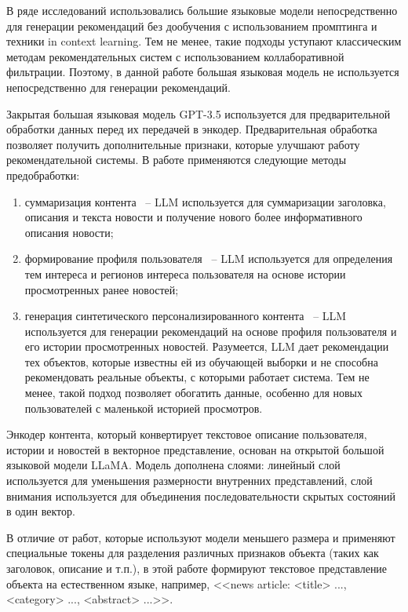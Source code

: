 В ряде исследований использовались большие языковые модели непосредственно для генерации рекомендаций без дообучения с использованием промптинга и техники in context learning. Тем не менее, такие подходы уступают классическим методам рекомендательных систем с использованием коллаборативной фильтрации. Поэтому, в данной работе большая языковая модель не используется непосредственно для генерации рекомендаций.

Закрытая большая языковая модель GPT-3.5 используется для предварительной обработки данных перед их передачей в энкодер. Предварительная обработка позволяет получить дополнительные признаки, которые улучшают работу рекомендательной системы. В работе применяются следующие методы предобработки:
\begin{enumerate}
    \item суммаризация контента ~-- LLM используется для суммаризации заголовка, описания и текста новости и получение нового более информативного описания новости;
    \item формирование профиля пользователя ~-- LLM используется для определения тем интереса и регионов интереса пользователя на основе истории просмотренных ранее новостей;
    \item генерация синтетического персонализированного контента ~-- LLM используется для генерации рекомендаций на основе профиля пользователя и его истории просмотренных новостей. Разумеется, LLM дает рекомендации тех объектов, которые известны ей из обучающей выборки и не способна рекомендовать реальные объекты, с которыми работает система. Тем не менее, такой подход позволяет обогатить данные, особенно для новых пользователей с маленькой историей просмотров.
\end{enumerate}

Энкодер контента, который конвертирует текстовое описание пользователя, истории и новостей в векторное представление, основан на открытой большой языковой модели LLaMA. Модель дополнена слоями: линейный слой используется для уменьшения размерности внутренних представлений, слой внимания используется для объединения последовательности скрытых состояний в один вектор.

В отличие от работ, которые используют модели меньшего размера и применяют специальные токены для разделения различных признаков объекта (таких как заголовок, описание и т.п.), в этой работе формируют текстовое представление объекта на естественном языке, например, <<news article: <title> ..., <category> ..., <abstract> ...>>.

